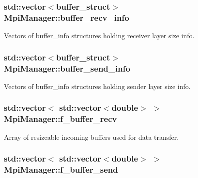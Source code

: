 \subsubsection[{\texorpdfstring{buffer\+\_\+recv\+\_\+info}{buffer_recv_info}}]{\setlength{\rightskip}{0pt plus 5cm}std\+::vector$<${\bf buffer\+\_\+struct}$>$ Mpi\+Manager\+::buffer\+\_\+recv\+\_\+info}\hypertarget{class_mpi_manager_a5e769fa077d24d62d10a9a0d303009d1}{}\label{class_mpi_manager_a5e769fa077d24d62d10a9a0d303009d1}


Vectors of buffer\+\_\+info structures holding receiver layer size info. 

\subsubsection[{\texorpdfstring{buffer\+\_\+send\+\_\+info}{buffer_send_info}}]{\setlength{\rightskip}{0pt plus 5cm}std\+::vector$<${\bf buffer\+\_\+struct}$>$ Mpi\+Manager\+::buffer\+\_\+send\+\_\+info}\hypertarget{class_mpi_manager_a3a91c2e8cfb15027a0681c198f82d257}{}\label{class_mpi_manager_a3a91c2e8cfb15027a0681c198f82d257}


Vectors of buffer\+\_\+info structures holding sender layer size info. 

\subsubsection[{\texorpdfstring{f\+\_\+buffer\+\_\+recv}{f_buffer_recv}}]{\setlength{\rightskip}{0pt plus 5cm}std\+::vector$<$ std\+::vector$<$double$>$ $>$ Mpi\+Manager\+::f\+\_\+buffer\+\_\+recv}\hypertarget{class_mpi_manager_ab8f1eeab50fd4812b3a51af1a6c43713}{}\label{class_mpi_manager_ab8f1eeab50fd4812b3a51af1a6c43713}


Array of resizeable incoming buffers used for data transfer. 

\subsubsection[{\texorpdfstring{f\+\_\+buffer\+\_\+send}{f_buffer_send}}]{\setlength{\rightskip}{0pt plus 5cm}std\+::vector$<$ std\+::vector$<$double$>$ $>$ Mpi\+Manager\+::f\+\_\+buffer\+\_\+send}\hypertarget{class_mpi_manager_aafbb74832f69a915927b9bf252bd971d}{}\label{class_mpi_manager_aafbb74832f69a915927b9bf252bd971d}


